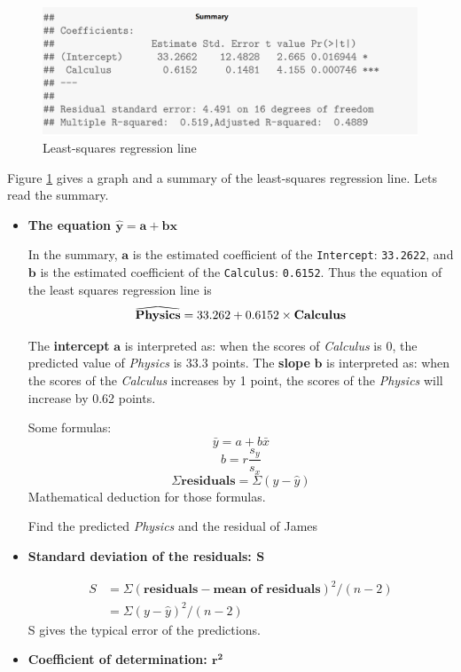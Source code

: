 \documentclass[a4paper, 12pt,twoside]{book}
\newcommand\reallywidehat[1]{%
\savestack{\tmpbox}{\stretchto{%
  \scaleto{%
    \scalerel*[\widthof{\ensuremath{#1}}]{\kern-.6pt\bigwedge\kern-.6pt}%
    {\rule[-\textheight/2]{1ex}{\textheight}}%
  }{\textheight}%
}{0.5ex}}%
\stackon[1pt]{#1}{\tmpbox}%
}
\begin{document}
\begin{itemize}
\begin{itemize}
\begin{figure}[H]
\begin{center}
 \includegraphics[scale=0.5]{SummaryLeastSquareRL.png}
 \end{center}
 \caption{Least-squares regression line}
 \label{LeastSquaresRegressionLine}
 \end{figure}
Figure \ref{LeastSquaresRegressionLine} gives a graph and a summary of the least-squares regression line. Lets read the summary.
\vspace{0.3cm}
\begin{itemize}
 \item \textbf{The equation $\mathbf{\hat{y} = a + bx}$}
 \vspace{0.6cm}
 
 In the summary, $\mathbf{a}$ is the estimated coefficient of the \texttt{Intercept}: \texttt{33.2622}, and $\mathbf{b}$ is the estimated coefficient of the \texttt{Calculus}: \texttt{0.6152}. Thus the equation of the least squares regression line is $$\reallywidehat{\textbf{Physics}} = 33.262 + 0.6152 \times \textbf{Calculus}$$
 
The \textbf{intercept} $\mathbf{a}$ is interpreted as: when the scores of \textit{Calculus} is 0, the predicted value of \textit{Physics} is $33.3$ points. The \textbf{slope} $\mathbf{b}$ is interpreted as: when the scores of the \textit{Calculus} increases by 1 point, the scores of the \textit{Physics} will increase by 0.62 points.
\vspace{0.6cm}

Some formulas:
$$\bar{y} = a + b\bar{x}$$
$$b = r\frac{s_y}{s_x}$$
$$\Sigma\textbf{residuals} = \Sigma(y-\hat{y})$$
\colorbox{dollarbill}{Mathematical deduction for those formulas.}

\colorbox{dollarbill}{Find the predicted \textit{Physics} and the residual of James }
\vspace{0.6cm}
\item \textbf{Standard deviation of the residuals: $\mathbf{S}$}


\begin{equation*}
\begin{split}
S &= \Sigma(\textbf{residuals} - \textbf{mean of residuals})^2/(n-2)\\
  &= \Sigma(y-\hat{y})^2/(n-2)
\end{split}
\end{equation*}
\colorbox{babypink}{S gives the typical error of the predictions.}
\vspace{0.6cm}
\item \textbf{Coefficient of determination: $\mathbf{r^2}$}
\vspace{0.6cm}


\end{itemize}
\end{itemize}
\end{itemize}
\end{document}
